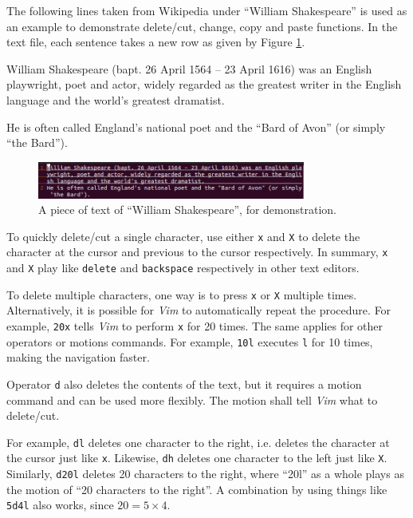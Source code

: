 The following lines taken from Wikipedia under ``William Shakespeare'' is used as an example to demonstrate delete/cut, change, copy and paste functions. In the text file, each sentence takes a new row as given by Figure \ref{ch3fig:vimdemo1}.

\begin{shortbox}
William Shakespeare (bapt. 26 April 1564 – 23 April 1616) was an English playwright, poet and actor, widely regarded as the greatest writer in the English language and the world's greatest dramatist.

He is often called England's national poet and the ``Bard of Avon'' (or simply ``the Bard'').
\end{shortbox}

\begin{figure}
\centering
\includegraphics[width=250pt]{chapters/ch_text_file_editing/figures/vimdemo1.png}
\caption{A piece of text of ``William Shakespeare'', for demonstration.} \label{ch3fig:vimdemo1}
\end{figure}

To quickly delete/cut a single character, use either \verb|x| and \verb|X| to delete the character at the cursor and previous to the cursor respectively. In summary, \verb|x| and \verb|X| play like \verb|delete| and \verb|backspace| respectively in other text editors.

To delete multiple characters, one way is to press \verb|x| or \verb|X| multiple times. Alternatively, it is possible for \textit{Vim} to automatically repeat the procedure. For example, \verb|20x| tells \textit{Vim} to perform \verb|x| for 20 times. The same applies for other operators or motions commands. For example, \verb|10l| executes \verb|l| for 10 times, making the navigation faster.

Operator \verb|d| also deletes the contents of the text, but it requires a motion command and can be used more flexibly. The motion shall tell \textit{Vim} what to delete/cut.

For example, \verb|dl| deletes one character to the right, i.e. deletes the character at the cursor just like \verb|x|. Likewise, \verb|dh| deletes one character to the left just like \verb|X|. Similarly, \verb|d20l| deletes 20 characters to the right, where ``20l'' as a whole plays as the motion of ``20 characters to the right''. A combination by using things like \verb|5d4l| also works, since $20=5\times 4$.

